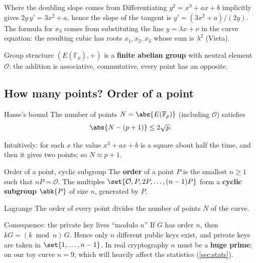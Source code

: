 \begin{framedobs}{Where the doubling slope comes from}
  Differentiating $y^2 = x^3 + ax + b$ implicitly gives $2y\, y' = 3x^2 + a$, hence the slope of the tangent is $y' = (3x^2 + a)/(2y)$. The formula for $x_3$ comes from substituting the line $y = \lambda x + \nu$ in the curve equation: the resulting cubic has roots $x_1, x_2, x_3$ whose sum is $\lambda^2$ (Vieta).
\end{framedobs}

\begin{framedthm}[label={thm:group}]{Group structure}
  $(E(\mathbb{F}_p), +)$ is a \textbf{finite abelian group} with neutral element $\mathcal{O}$: the addition is associative, commutative, every point has an opposite.
\end{framedthm}

\subsection{How many points? Order of a point}

\begin{framedthm}[label={thm:hasse}]{Hasse's bound}
  The number of points $N = \abs{E(\mathbb{F}_p)}$ (including $\mathcal{O}$) satisfies
  \[
    \abs{N - (p+1)} \le 2\sqrt{p}.
  \]
\end{framedthm}

Intuitively: for each $x$ the value $x^3 + ax + b$ is a square about half the time, and then it gives two points; so $N \approx p + 1$.

\begin{frameddefn}[label={def:order}]{Order of a point, cyclic subgroup}
  The \textbf{order} of a point $P$ is the smallest $n \ge 1$ such that $nP = \mathcal{O}$. The multiples $\set{\mathcal{O}, P, 2P, \ldots, (n-1)P}$ form a \textbf{cyclic subgroup} $\abk{P}$ of size $n$, generated by $P$.
\end{frameddefn}

\begin{framedthm}[label={thm:lagrange}]{Lagrange}
  The order of every point divides the number of points $N$ of the curve.
\end{framedthm}

\begin{framedobs}{Consequence: the private key lives ``modulo $n$''}
  If $G$ has order $n$, then $kG = (k \bmod n)\, G$. Hence only $n$ different public keys exist, and private keys are taken in $\set{1, \ldots, n-1}$. In real cryptography $n$ must be a \textbf{huge prime}; on our toy curve $n = 9$, which will heavily affect the statistics (\cref{sec:stats}).
\end{framedobs}

